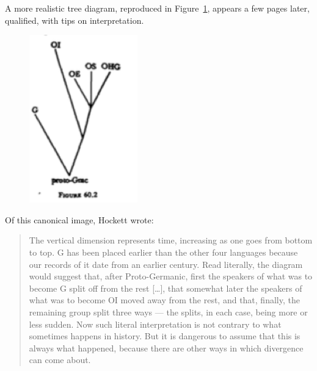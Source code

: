 \documentclass[output=paper]{langscibook}
\begin{document}
A more realistic tree diagram, reproduced in Figure~\ref{fig:kaplan:hockett1959519}, appears a few pages later, qualified, with tips on interpretation.

\begin{figure}
    \centering
    \includegraphics[scale=1]{figures/hockett1958-519.png}
    \caption{\citet[519]{Hockett19591958}}
    \label{fig:kaplan:hockett1959519}
\end{figure}

Of this canonical image, Hockett wrote:

\begin{quotation}
The vertical dimension represents time, increasing as one goes from bottom to top. G has been placed earlier than the other four languages because our records of it date from an earlier century. Read literally, the diagram would suggest that, after Proto-Germanic, first the speakers of what was to become G split off from the rest […], that somewhat later the speakers of what was to become OI moved away from the rest, and that, finally, the remaining group split three ways — the splits, in each case, being more or less sudden. Now such literal interpretation is not contrary to what sometimes happens in history. But it is dangerous to assume that this is always what happened, because there are other ways in which divergence can come about.  \citep[519--521]{Hockett19591958}
\end{quotation}
\end{document}
